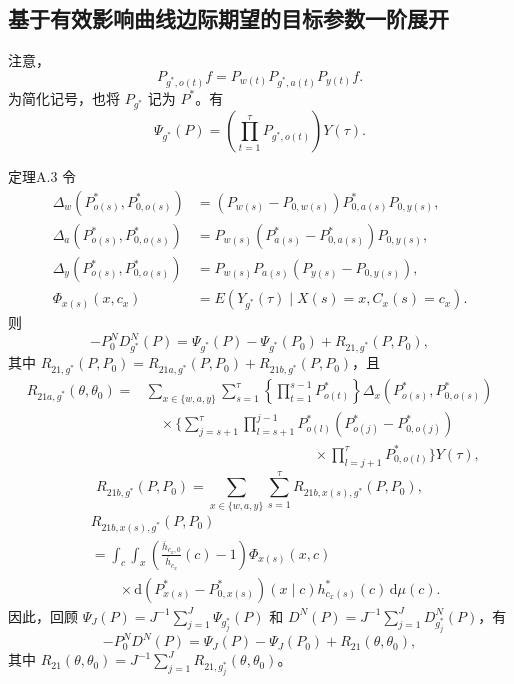 \subsection{基于有效影响曲线边际期望的目标参数一阶展开}

注意，
\[
P_{g^*,o(t)}f=P_{w(t)}P_{g^*,a(t)}P_{y(t)}f.
\]
为简化记号，也将 $P_{g^*}$ 记为 $P^*$。有
\[
\Psi_{g^*}(P)=\left(\prod_{t=1}^{\tau}P_{g^*,o(t)}\right)Y(\tau).
\]

\begin{bookresult}{定理}{A.3}
令
\[
\begin{aligned}
\Delta_w(P^*_{o(s)},P^*_{0,o(s)})
 &=(P_{w(s)}-P_{0,w(s)})P^*_{0,a(s)}P_{0,y(s)},\\
\Delta_a(P^*_{o(s)},P^*_{0,o(s)})
 &=P_{w(s)}(P^*_{a(s)}-P^*_{0,a(s)})P_{0,y(s)},\\
\Delta_y(P^*_{o(s)},P^*_{0,o(s)})
 &=P_{w(s)}P_{a(s)}(P_{y(s)}-P_{0,y(s)}),\\
\Phi_{x(s)}(x,c_x)
 &=E(Y_{g^*}(\tau)\mid X(s)=x,C_x(s)=c_x).
\end{aligned}
\]
则
\[
-P_0^ND_{g^*}^N(P)=\Psi_{g^*}(P)-\Psi_{g^*}(P_0)+R_{21,g^*}(P,P_0),
\]
其中 $R_{21,g^*}(P,P_0)=R_{21a,g^*}(P,P_0)+R_{21b,g^*}(P,P_0)$，且
\begin{equation}
\begin{aligned}
R_{21a,g^*}(\theta,\theta_0)
={}&\sum_{x\in\{w,a,y\}}\sum_{s=1}^{\tau}
 \left\{\prod_{t=1}^{s-1}P^*_{o(t)}\right\}
 \Delta_x(P^*_{o(s)},P^*_{0,o(s)})\\
&\quad\times\Biggl\{\sum_{j=s+1}^{\tau}
 \prod_{l=s+1}^{j-1}P^*_{o(l)}(P^*_{o(j)}-P^*_{0,o(j)})\\
&\hspace{12em}\times\prod_{l=j+1}^{\tau}P^*_{0,o(l)}\Biggr\}Y(\tau),
\end{aligned}
\tag{A.12}
\end{equation}
\[
R_{21b,g^*}(P,P_0)
 =\sum_{x\in\{w,a,y\}}\sum_{s=1}^{\tau}R_{21b,x(s),g^*}(P,P_0),
\]
\[
\begin{aligned}
&R_{21b,x(s),g^*}(P,P_0)\\
&=\int_c\int_x\left(\frac{\bar h_{c_x,0}}{\bar h_{c_x}}(c)-1\right)
 \Phi_{x(s)}(x,c)\\
&\qquad\times\mathrm d(P^*_{x(s)}-P^*_{0,x(s)})(x\mid c)
 h^*_{c_x(s)}(c)\,\mathrm d\mu(c).
\end{aligned}
\]
因此，回顾
$\Psi_J(P)=J^{-1}\sum_{j=1}^J\Psi_{g_j^*}(P)$ 和
$D^N(P)=J^{-1}\sum_{j=1}^JD^N_{g_j^*}(P)$，有
\[
-P_0^ND^N(P)=\Psi_J(P)-\Psi_J(P_0)+R_{21}(\theta,\theta_0),
\]
其中 $R_{21}(\theta,\theta_0)=J^{-1}\sum_{j=1}^JR_{21,g_j^*}(\theta,\theta_0)$。
\end{bookresult}

